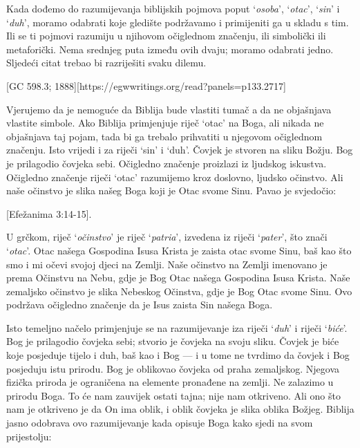 Kada dođemo do razumijevanja biblijskih pojmova poput ‘\textit{osoba}’, ‘\textit{otac}’, ‘\textit{sin}’ i ‘\textit{duh}’, moramo odabrati koje gledište podržavamo i primijeniti ga u skladu s tim. Ili se ti pojmovi razumiju u njihovom očiglednom značenju, ili simbolički ili metaforički. Nema srednjeg puta između ovih dvaju; moramo odabrati jedno. Sljedeći citat trebao bi razriješiti svaku dilemu.


[GC 598.3; 1888][https://egwwritings.org/read?panels=p133.2717]

Vjerujemo da je nemoguće da Biblija bude vlastiti tumač a da ne objašnjava vlastite simbole. Ako Biblija primjenjuje riječ ‘otac’ na Boga, ali nikada ne objašnjava taj pojam, tada bi ga trebalo prihvatiti u njegovom očiglednom značenju. Isto vrijedi i za riječi ‘sin’ i ‘duh’. Čovjek je stvoren na sliku Božju. Bog je prilagodio čovjeka sebi. Očigledno značenje proizlazi iz ljudskog iskustva. Očigledno značenje riječi ‘otac’ razumijemo kroz doslovno, ljudsko očinstvo. Ali naše očinstvo je slika našeg Boga koji je Otac svome Sinu. Pavao je svjedočio:

[Efežanima 3:14-15].

U grčkom, riječ ‘\textit{očinstvo}’ je riječ ‘\textit{patria}’, izvedena iz riječi ‘\textit{pater}’, što znači ‘\textit{otac}’. Otac našega Gospodina Isusa Krista je zaista otac svome Sinu, baš kao što smo i mi očevi svojoj djeci na Zemlji. Naše očinstvo na Zemlji imenovano je prema Očinstvu na Nebu, gdje je Bog Otac našega Gospodina Isusa Krista. Naše zemaljsko očinstvo je slika Nebeskog Očinstva, gdje je Bog Otac svome Sinu. Ovo podržava očigledno značenje da je Isus zaista Sin našega Boga.

Isto temeljno načelo primjenjuje se na razumijevanje iza riječi ‘\textit{duh}’ i riječi ‘\textit{biće}’. Bog je prilagodio čovjeka sebi; stvorio je čovjeka na svoju sliku. Čovjek je biće koje posjeduje tijelo i duh, baš kao i Bog — i u tome ne tvrdimo da čovjek i Bog posjeduju istu prirodu. Bog je oblikovao čovjeka od praha zemaljskog. Njegova fizička priroda je ograničena na elemente pronađene na zemlji. Ne zalazimo u prirodu Boga. To će nam zauvijek ostati tajna; nije nam otkriveno. Ali ono što nam je otkriveno je da On ima oblik, i oblik čovjeka je slika oblika Božjeg. Biblija jasno odobrava ovo razumijevanje kada opisuje Boga kako sjedi na svom prijestolju:

